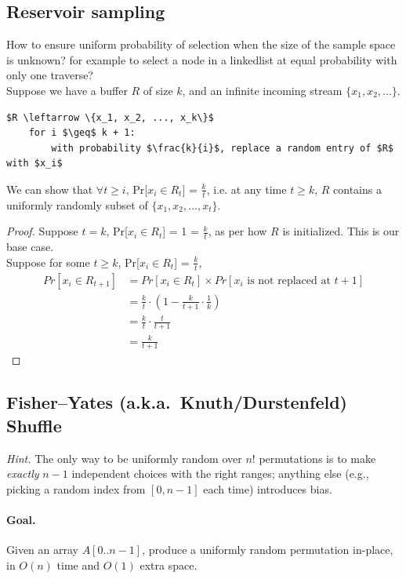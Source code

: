 \documentclass[9pt]{extarticle}
\begin{document}
\subsection{Reservoir sampling}
How to ensure uniform probability of selection when the size of the sample space is unknown? for example to select a node in a linkedlist at equal probability with only one traverse?\\ 
Suppose we have a buffer $R$ of size $k$, and an infinite incoming stream $\{x_1, x_2, ...\}$. 
\begin{lstlisting}[mathescape=true]
    $R \leftarrow \{x_1, x_2, ..., x_k\}$
    for i $\geq$ k + 1:
        with probability $\frac{k}{i}$, replace a random entry of $R$ with $x_i$
\end{lstlisting}
We can show that $\forall t \geq i$, Pr[$x_i \in R_{t}$] = $\frac{k}{t}$, i.e. at any time $t \geq k$, $R$ contains a uniformly randomly subset of $\{x_1, x_2, ..., x_t\}$.\\
\begin{proof}
    Suppose $t = k$, Pr[$x_i \in R_t$] = 1 = $\frac{k}{t}$, as per how $R$ is initialized. This is our base case.\\
    Suppose for some $t \geq k$, Pr[$x_i \in R_t$] = $\frac{k}{t}$,\\
    \begin{align*}
        Pr[x_i \in R_{t+1}] &= Pr[x_i \in R_t] \times Pr[x_i \text{ is not replaced at } t+1]\\
        &= \frac{k}{t} \cdot (1 - \frac{k}{t+1}\cdot \frac{1}{k})\\
        &= \frac{k}{t} \cdot \frac{t}{t+1}\\
        &= \frac{k}{t+1}
    \end{align*}

\end{proof}

\subsection{Fisher--Yates (a.k.a.\ Knuth/Durstenfeld) Shuffle}
\textit{Hint.} The only way to be uniformly random over $n!$ permutations is to make \emph{exactly} $n-1$ independent choices with the right ranges; anything else (e.g., picking a random index from $[0,n\!-\!1]$ each time) introduces bias.

\paragraph{Goal.} Given an array $A[0..n-1]$, produce a uniformly random permutation in-place, in $O(n)$ time and $O(1)$ extra space.
\end{document}
